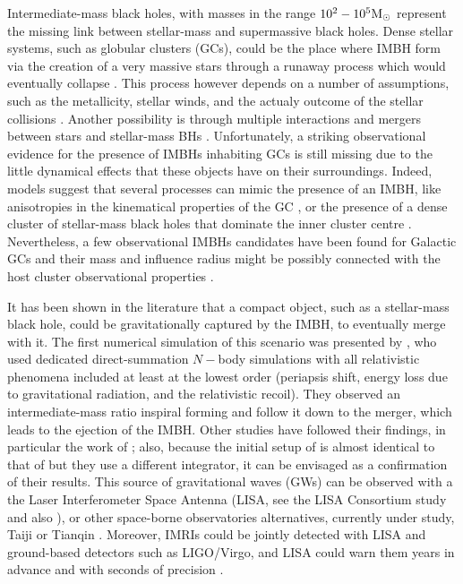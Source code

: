 \documentclass[useAMS,usenatbib]{mn2e}
\newcommand{\Ms}{{\rm M}_\odot}
\begin{document}
Intermediate-mass black holes, with masses in the range $10^2-10^5\Ms$
represent the missing link between stellar-mass and supermassive black holes.
Dense stellar systems, such as globular clusters (GCs), could be the place
where IMBH form via the creation of a very massive stars through a runaway
process which would eventually collapse
\citep{PortegiesZwartMcMillan00,GurkanEtAl04,PortegiesZwartEtAl04,
FreitagEtAl06, giersz15, mapelli16}.  This process however depends on a number
of assumptions, such as the metallicity, stellar winds, and the actualy outcome
of the stellar collisions
\citep[see][]{BelkusEtAl07,SuzukiEtAl07,GlebbeekEtAl09}.
Another possibility is through
multiple interactions and mergers between stars and stellar-mass BHs
\citep{giersz15}. Unfortunately, a striking observational evidence for the
presence of IMBHs inhabiting GCs is still missing due to the little
dynamical effects that these objects have on their surroundings. Indeed, models
suggest that several processes can mimic the presence of an IMBH, like anisotropies in the
kinematical properties of the GC \citep{zocchi}, or the presence of a dense cluster of
stellar-mass black holes that dominate the inner cluster centre
\citep{AAG18a,AAG18b,AS16,vandermarel10}. Nevertheless, a few observational
IMBHs candidates have been found for Galactic GCs
\citep{noyola10,lu13,lanzoni13,kiziltan17} and their mass and influence radius
might be possibly connected with the host cluster observational properties
\citep{AAG18a}. 

It has been shown in the literature that a compact object, such as a
stellar-mass black hole, could be gravitationally captured by the IMBH, to
eventually merge with it. The first numerical simulation of this scenario was
presented by \cite{konstantinidis13}, who used dedicated direct-summation
$N-$body simulations with all relativistic phenomena included at least at the
lowest order (periapsis shift, energy loss due to gravitational radiation, and
the relativistic recoil). They observed an intermediate-mass ratio inspiral
\citep{Amaro-SeoaneLRR2012,Amaro-SeoaneEtAl07} forming and follow it down to
the merger, which leads to the ejection of the IMBH. Other studies have
followed their findings, in particular the work of
\cite{leigh14,MacLeodEtAl2016}; also, because the initial setup of
\cite{haster16} is almost identical to that of \cite{konstantinidis13} but they
use a different integrator, it can be envisaged as a confirmation of their
results. This source of gravitational waves (GWs) can be observed with a the
Laser Interferometer Space Antenna (LISA, see the LISA Consortium study
\citealt{Amaro-SeoaneEtAl2017} and also
\citealt{Amaro-SeoaneEtAl2013,Amaro-SeoaneEtAl2012}), or other space-borne
observatories alternatives, currently under study, Taiji \citep{taiji17} or
Tianqin \citep{tianqin16}. Moreover, IMRIs could be jointly detected with LISA and
ground-based detectors such as LIGO/Virgo, and LISA could warn them years in
advance and with seconds of precision \citep{Amaro-Seoane2018}.
\end{document}
